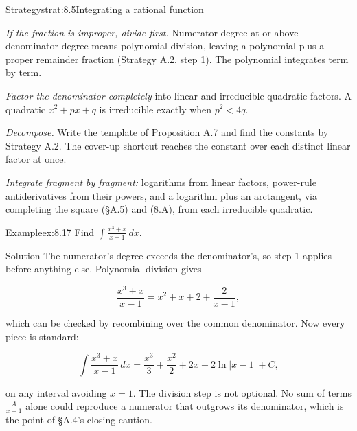 \documentclass[a4paper,12pt,oneside]{memoir}
\begin{document}
\begin{envstrategy}{Strategy}{strat:8.5}{Integrating a rational function}
\begin{steps}
  \item \emph{If the fraction is improper, divide first.} Numerator degree at or above denominator degree means polynomial division, leaving a polynomial plus a proper remainder fraction (Strategy A.2, step 1). The polynomial integrates term by term.
  \item \emph{Factor the denominator completely} into linear and irreducible quadratic factors. A quadratic \(x^{2} + px + q\) is irreducible exactly when \(p^{2} < 4q\).
  \item \emph{Decompose.} Write the template of Proposition A.7 and find the constants by Strategy A.2. The cover-up shortcut reaches the constant over each distinct linear factor at once.
  \item \emph{Integrate fragment by fragment:} logarithms from linear factors, power-rule antiderivatives from their powers, and a logarithm plus an arctangent, via completing the square (§A.5) and (8.A), from each irreducible quadratic.
\end{steps}
\end{envstrategy}
\begin{workedexample}
\begin{envexample}{Example}{ex:8.17}{}
Find \(\displaystyle\int \frac{x^{3} + x}{x - 1}\,dx\).
\end{envexample}
\begin{envsolution}{Solution}{}{}
The numerator’s degree exceeds the denominator’s, so step 1 applies before anything else. Polynomial division gives

\[ \frac{x^{3} + x}{x - 1} = x^{2} + x + 2 + \frac{2}{x - 1}, \]

which can be checked by recombining over the common denominator. Now every piece is standard:

\[ \int \frac{x^{3} + x}{x - 1}\,dx = \frac{x^{3}}{3} + \frac{x^{2}}{2} + 2x + 2\ln\lvert x - 1\rvert + C, \]

on any interval avoiding \(x = 1\). The division step is not optional. No sum of terms \(\frac{A}{x-1}\) alone could reproduce a numerator that outgrows its denominator, which is the point of §A.4’s closing caution. \qedmark
\end{envsolution}
\end{workedexample}
\end{document}
